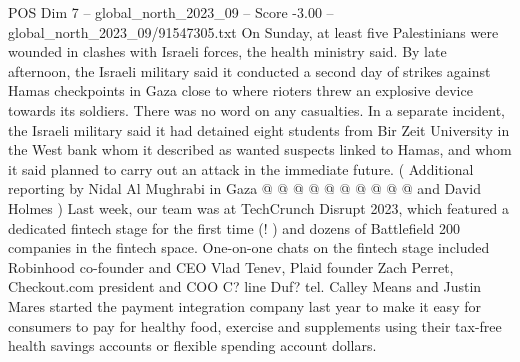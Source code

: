 \begin{textsample}{POS Dim 7 – global\_north\_2023\_09 – Score -3.00 – global\_north\_2023\_09/91547305.txt}
On Sunday, at least five Palestinians were wounded in clashes with Israeli forces, the health ministry said.
By late afternoon, the Israeli military said it conducted a second day of strikes against Hamas checkpoints in Gaza close to where rioters threw an explosive device towards its soldiers.
There was no word on any casualties.
In a separate incident, the Israeli military said it had detained eight students from Bir Zeit University in the West bank whom it described as wanted suspects linked to Hamas, and whom it said planned to carry out an attack in the immediate future. ( Additional reporting by Nidal Al Mughrabi in Gaza @ @ @ @ @ @ @ @ @ @ and David Holmes ) Last week, our team was at TechCrunch Disrupt 2023, which featured a dedicated fintech stage for the first time (! ) and dozens of Battlefield 200 companies in the fintech space.
One-on-one chats on the fintech stage included Robinhood co-founder and CEO Vlad Tenev, Plaid founder Zach Perret, Checkout.com president and COO C? line Duf? tel.
Calley Means and Justin Mares started the payment integration company last year to make it easy for consumers to pay for healthy food, exercise and supplements using their tax-free health savings accounts or flexible spending account dollars.

\end{textsample}
